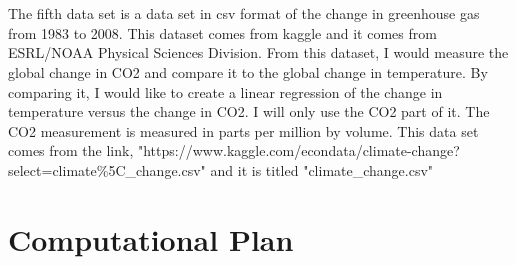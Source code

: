 \documentclass[fontsize=11pt]{article}
\begin{document}
\\\\
The fifth data set is a data set in csv format of the change in greenhouse gas from 1983 to 2008. This dataset comes from kaggle and it comes from ESRL/NOAA Physical Sciences Division. From this dataset, I would measure the global change in CO2 and compare it to the global change in temperature. By comparing it, I would like to create a linear regression of the change in temperature versus the change in CO2. I will only use the CO2 part of it. The CO2 measurement is measured in parts per million by volume. This data set comes from the link, "https://www.kaggle.com/econdata/climate-change?select=climate\%5C\_change.csv" and it is titled "climate\_change.csv"
\section*{Computational Plan}
\end{document}
